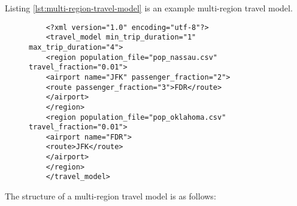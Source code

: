 Listing \ref{lst:multi-region-travel-model} is an example multi-region travel model.

\begin{figure}[h]
	\begin{lstlisting}
	<?xml version="1.0" encoding="utf-8"?>
	<travel_model min_trip_duration="1" max_trip_duration="4">
	<region population_file="pop_nassau.csv" travel_fraction="0.01">
	<airport name="JFK" passenger_fraction="2">
	<route passenger_fraction="3">FDR</route>
	</airport>
	</region>
	<region population_file="pop_oklahoma.csv" travel_fraction="0.01">
	<airport name="FDR">
	<route>JFK</route>
	</airport>
	</region>
	</travel_model>
	\end{lstlisting}
\end{figure}

The structure of a multi-region travel model is as follows:

